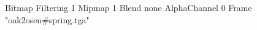 {Bitmap
	{Filtering 1}
	{Mipmap 1}
	{Blend none}
	{AlphaChannel 0}
	{Frame "oak2osen#spring.tga"}
}
